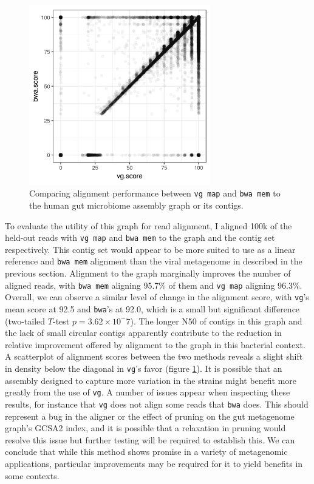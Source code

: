 \begin{figure}[htbp!]
  \centering
  \includegraphics[width=0.7\textwidth]{Chapter3/Figs/human_gut_microbiome_SRS105153_holdout_vg_vs_bwa_scatter.png}
  \caption[Human gut microbiome alignment comparison]{
    Comparing alignment performance between {\tt vg map} and {\tt bwa mem} to the human gut microbiome assembly graph or its contigs.
  }
  \label{fig:human_gut_microbiome_scatter}
\end{figure}

To evaluate the utility of this graph for read alignment, I aligned 100k of the held-out reads with {\tt vg map} and {\tt bwa mem} to the graph and the contig set respectively.
This contig set would appear to be more suited to use as a linear reference and {\tt bwa mem} alignment than the viral metagenome in described in the previous section.
Alignment to the graph marginally improves the number of aligned reads, with {\tt bwa mem} aligning 95.7\% of them and {\tt vg map} aligning 96.3\%.
Overall, we can observe a similar level of change in the alignment score, with {\tt vg}'s mean score at 92.5 and {\tt bwa}'s at 92.0, which is a small but significant difference (two-tailed $T$-test $p=3.62\times 10^-7$).
The longer N50 of contigs in this graph and the lack of small circular contigs apparently contribute to the reduction in relative improvement offered by alignment to the graph in this bacterial context.
A scatterplot of alignment scores between the two methods reveals a slight shift in density below the diagonal in {\tt vg}'s favor (figure \ref{fig:human_gut_microbiome_scatter}).
It is possible that an assembly designed to capture more variation in the strains might benefit more greatly from the use of {\tt vg}.
A number of issues appear when inspecting these results, for instance that {\tt vg} does not align some reads that {\tt bwa} does.
This should represent a bug in the aligner or the effect of pruning on the gut metagenome graph's GCSA2 index, and it is possible that a relaxation in pruning would resolve this issue but further testing will be required to establish this.
We can conclude that while this method shows promise in a variety of metagenomic applications, particular improvements may be required for it to yield benefits in some contexts.


